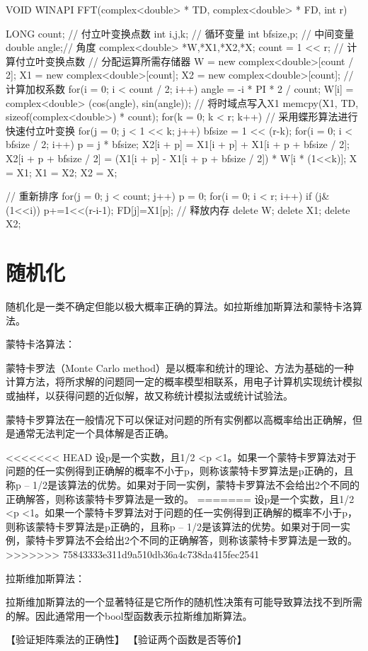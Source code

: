 \begin{Code}
	VOID WINAPI FFT(complex<double> * TD, complex<double> * FD, int r)  {  
		LONG count;  // 付立叶变换点数
		int i,j,k;  // 循环变量
		int bfsize,p;  // 中间变量  
		double angle;// 角度  
		complex<double> *W,*X1,*X2,*X;  
		count = 1 << r;  // 计算付立叶变换点数
		// 分配运算所需存储器  
		W = new complex<double>[count / 2];  
		X1 = new complex<double>[count];  
		X2 = new complex<double>[count];  
		// 计算加权系数  
		for(i = 0; i < count / 2; i++)  {  
			angle = -i * PI * 2 / count;  
			W[i] = complex<double> (cos(angle), sin(angle));  
		}  
		// 将时域点写入X1  
		memcpy(X1, TD, sizeof(complex<double>) * count);  
		for(k = 0; k < r; k++) {  // 采用蝶形算法进行快速付立叶变换 
			for(j = 0; j < 1 << k; j++)  {  
				bfsize = 1 << (r-k);  
				for(i = 0; i < bfsize / 2; i++)  {  
					p = j * bfsize;  
					X2[i + p] = X1[i + p] + X1[i + p + bfsize / 2];  
					X2[i + p + bfsize / 2] = (X1[i + p] - X1[i + p + bfsize / 2]) * W[i * (1<<k)];  
				}  
			}  
			X = X1;  
			X1 = X2;  
			X2 = X;  
		}  
		
		// 重新排序  
		for(j = 0; j < count; j++)  {  
			p = 0;  
			for(i = 0; i < r; i++)  {  
				if (j&(1<<i))  
					p+=1<<(r-i-1);  
			}  
			FD[j]=X1[p];  
		}  	
		// 释放内存  
		delete W;  
		delete X1;  
		delete X2;  
	}  
\end{Code}

\section{随机化}
随机化是一类不确定但能以极大概率正确的算法。如拉斯维加斯算法和蒙特卡洛算法。

蒙特卡洛算法：

蒙特卡罗法（Monte Carlo method）是以概率和统计的理论、方法为基础的一种计算方法，将所求解的问题同一定的概率模型相联系，用电子计算机实现统计模拟或抽样，以获得问题的近似解，故又称统计模拟法或统计试验法。

蒙特卡罗算法在一般情况下可以保证对问题的所有实例都以高概率给出正确解，但是通常无法判定一个具体解是否正确。

<<<<<<< HEAD
设p是一个实数，且1/2 <p <1。如果一个蒙特卡罗算法对于问题的任一实例得到正确解的概率不小于p，则称该蒙特卡罗算法是p正确的，且称p – 
1/2是该算法的优势。如果对于同一实例，蒙特卡罗算法不会给出2个不同的正确解答，则称该蒙特卡罗算法是一致的。
=======
设p是一个实数，且1/2 <p <1。如果一个蒙特卡罗算法对于问题的任一实例得到正确解的概率不小于p，则称该蒙特卡罗算法是p正确的，且称p – 1/2是该算法的优势。如果对于同一实例，蒙特卡罗算法不会给出2个不同的正确解答，则称该蒙特卡罗算法是一致的。
>>>>>>> 75843333e311d9a510db36a4c738da415fec2541

拉斯维加斯算法：

拉斯维加斯算法的一个显著特征是它所作的随机性决策有可能导致算法找不到所需的解。因此通常用一个bool型函数表示拉斯维加斯算法。

【验证矩阵乘法的正确性】
【验证两个函数是否等价】